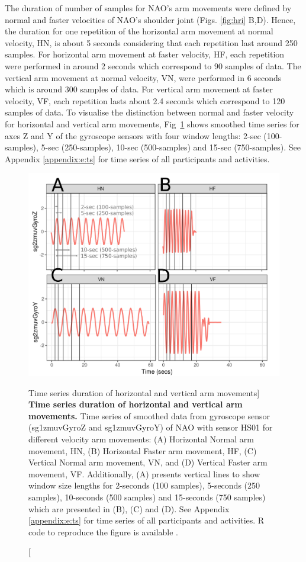 The duration of number of samples for NAO's arm movements were defined by 
normal and faster velocities of NAO's shoulder joint (Figs. \ref{fig:hri} B,D). 
Hence, the duration for one repetition of the horizontal 
arm movement at normal velocity, HN, is about 5 seconds considering that 
each repetition last around 250 samples. For horizontal arm movement at 
faster velocity, HF, each repetition were performed in around 2 seconds 
which correspond to 90 samples of data. 
The vertical arm movement at normal velocity, VN, were performed  in 6 seconds 
which is around 300 samples of data.
For vertical arm movement at faster velocity, VF, each repetition lasts 
about 2.4 seconds which correspond to 120 samples of data.
To visualise the distinction between normal and faster velocity for horizontal 
and vertical arm movements, Fig~\ref{fig:sts} shows smoothed time series 
for axes Z and Y of the gyroscope sensors with four window lengths: 
2-sec (100-samples), 5-sec (250-samples), 10-sec (500-samples) 
and 15-sec (750-samples).
See Appendix \ref{appendix:e:ts} for 
time series of all participants and activities. 
\begin{figure}
  \centering
  \includegraphics[width=1.0\textwidth]{fig_4_04}
    \caption
	[Time series duration of horizontal and vertical arm movements]{
	{\bf Time series duration of horizontal and vertical arm movements.} 
		Time series of smoothed data from gyroscope sensor 
		(sg1zmuvGyroZ and sg1zmuvGyroY) of NAO 
		with sensor HS01 for different velocity arm movements: 
		(A) Horizontal Normal arm movement, HN, 
		(B) Horizontal Faster arm movement, HF,
		(C) Vertical Normal arm movement, VN, and 
		(D) Vertical Faster arm movement, VF.
		Additionally, (A) presents vertical lines 
		to show window size lengths for 2-seconds 
		(100 samples), 5-seconds (250 samples), 
		10-seconds (500 samples) and 15-seconds (750 samples)
		which are presented in (B), (C) and (D).
		See Appendix \ref{appendix:e:ts} for 
		time series of all participants and activities. 
		R code to reproduce the figure is available \cite{hwum2018}.
        }
	\label{fig:sts}
\end{figure}

